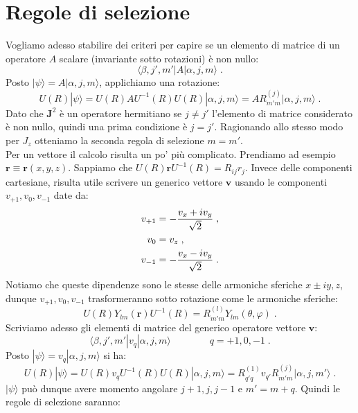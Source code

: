 \documentclass[10pt,a4paper]{report}
\theoremstyle{definition}
\numberwithin{equation}{section}
\newcommand{\bra}{\langle}
\newcommand{\ket}{\rangle}
\begin{document}
\section{Regole di selezione}
Vogliamo adesso stabilire dei criteri per capire se un elemento di matrice di un operatore $A$ scalare (invariante sotto rotazioni) è non nullo:
\begin{equation}
\bra \beta,j',m'|A|\alpha,j,m\ket\;.
\end{equation}
Posto $|\psi\ket=A|\alpha,j,m\ket$, applichiamo una rotazione:
\begin{equation}
U(R)|\psi\ket=U(R)AU^{-1}(R)U(R)|\alpha,j,m\ket=AR^{(j)}_{m'm}|\alpha,j,m\ket\;.
\end{equation}
Dato che $\mathbf{J}^2$ è un operatore hermitiano se $j\ne j'$ l'elemento di matrice considerato è non nullo, quindi una prima condizione è $j=j'$. Ragionando allo stesso modo per $J_z$ otteniamo la seconda regola di selezione $m=m'$. \\
Per un vettore il calcolo risulta un po' più complicato. Prendiamo ad esempio $\mathbf{r}\equiv \mathbf{r}(x,y,z)$. Sappiamo che $U(R)\mathbf{r}U^{-1}(R)=R_{ij}r_j$. Invece delle componenti cartesiane, risulta utile scrivere un generico vettore $\mathbf{v}$ usando le componenti $v_{+1},v_0,v_{-1}$ date da:
\begin{align}
v_{+1} &= -\frac{v_x+iv_y}{\sqrt{2}} \notag\;, \\
v_0 &= v_z \notag\;, \\
v_{-1} &= -\frac{v_x-iv_y}{\sqrt{2}}\;.
\end{align}
Notiamo che queste dipendenze sono le stesse delle armoniche sferiche $x\pm iy,z$, dunque $v_{+1},v_0,v_{-1}$ trasformeranno sotto rotazione come le armoniche sferiche:
\begin{equation*}
U(R)Y_{lm}(\mathbf{r})U^{-1}(R)=R^{(l)}_{m'm}Y_{lm}(\theta,\varphi)\;.
\end{equation*}
Scriviamo adesso gli elementi di matrice del generico operatore vettore $\mathbf{v}$:
\begin{equation}
\bra\beta,j',m'|v_q|\alpha,j,m\ket \qquad \qquad q=+1,0,-1\;.
\end{equation}
Posto $|\psi\ket=v_q|\alpha,j,m\ket$ si ha:
\begin{equation}
U(R)|\psi\ket=U(R)v_qU^{-1}(R)U(R)|\alpha,j,m\ket=R^{(1)}_{q'q}v_{q'}R^{(j)}_{m'm}|\alpha,j,m'\ket\;.
\end{equation}
$|\psi\ket$ può dunque avere momento angolare $j+1,j,j-1$ e $m'=m+q$. Quindi le regole di selezione saranno:
\end{document}
